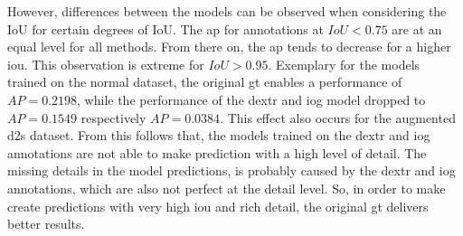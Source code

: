 However, differences between the models can be observed when considering the IoU for certain degrees of IoU.
The \gls{ap} for annotations at $ IoU < 0.75 $ are at an equal level for all methods.
From there on, the \gls{ap} tends to decrease for a higher \gls{iou}.
This observation is extreme for $ IoU > 0.95 $. 
Exemplary for the models trained on the normal dataset, the original \gls{gt} enables a performance of $ AP = 0.2198 $, while the performance of the \gls{dextr} and \gls{iog} model dropped to $ AP = 0.1549 $ respectively $ AP = 0.0384 $.
This effect also occurs for the augmented \gls{d2s} dataset.
From this follows that, the models trained on the \gls{dextr} and \gls{iog} annotations are not able to make prediction with a high level of detail.
The missing details in the model predictions, is probably caused by the \gls{dextr} and \gls{iog} annotations, which are also not perfect at the detail level.
So, in order to make create predictions with very high \gls{iou} and rich detail, the original \gls{gt} delivers better results.


